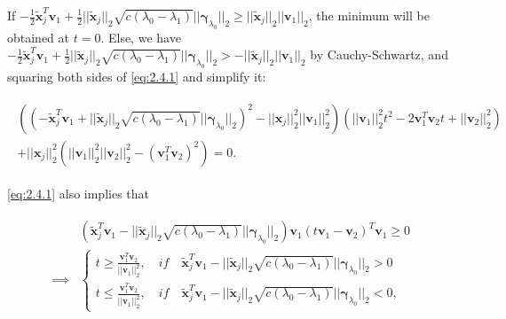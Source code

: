 If $-\frac{1}{2}\tilde{\boldsymbol x}_j^T\boldsymbol v_1+\frac{1}{2}||\tilde{\boldsymbol x}_j||_2\sqrt{c(\lambda_0-\lambda_1)}||\boldsymbol\gamma_{\lambda_0}||_2\geq ||\tilde{\boldsymbol x}_j||_2||\boldsymbol v_1||_2$, the minimum will be obtained at $t=0$. Else, we have $-\frac{1}{2}\tilde{\boldsymbol x}_j^T\boldsymbol v_1+\frac{1}{2}||\tilde{\boldsymbol x}_j||_2\sqrt{c(\lambda_0-\lambda_1)}||\boldsymbol\gamma_{\lambda_0}||_2>- ||\tilde{\boldsymbol x}_j||_2||\boldsymbol v_1||_2$ by Cauchy-Schwartz, and squaring both sides of \eqref{eq:2.4.1} and simplify it:

\begin{gather}
    \begin{aligned}
        \left(\left(-\tilde{\boldsymbol x}_j^T\boldsymbol v_1+||\tilde{\boldsymbol x}_j||_2\sqrt{c(\lambda_0-\lambda_1)}||\boldsymbol\gamma_{\lambda_0}||_2\right)^2-||\boldsymbol x_j||_2^2||\boldsymbol v_1||_2^2\right)\left(||\boldsymbol v_1||_2^2t^2-2\boldsymbol v_1^T\boldsymbol v_2 t+||\boldsymbol v_2||_2^2\right)\\
        +||\boldsymbol x_j||_2^2(||\boldsymbol v_1||_2^2||\boldsymbol v_2||_2^2-(\boldsymbol v_1^T\boldsymbol v_2)^2)=0.
    \end{aligned}
\end{gather}

\eqref{eq:2.4.1} also implies that

\begin{gather}
    \begin{aligned}
        &\left(\tilde{\boldsymbol x}_j^T\boldsymbol v_1-||\tilde{\boldsymbol x}_j||_2\sqrt{c(\lambda_0-\lambda_1)}||\boldsymbol\gamma_{\lambda_0}||_2\right)\boldsymbol v_1(t\boldsymbol v_1-\boldsymbol v_2)^T\boldsymbol v_1\geq 0\\
        \implies&\begin{cases}
        t\geq\frac{\boldsymbol v_1^T\boldsymbol v_2}{||\boldsymbol v_1||_2^2},\quad \textit{if}\quad\tilde{\boldsymbol x}_j^T\boldsymbol v_1-||\tilde{\boldsymbol x}_j||_2\sqrt{c(\lambda_0-\lambda_1)}||\boldsymbol\gamma_{\lambda_0}||_2 >0\\
        t\leq\frac{\boldsymbol v_1^T\boldsymbol v_2}{||\boldsymbol v_1||_2^2},\quad \textit{if}\quad\tilde{\boldsymbol x}_j^T\boldsymbol v_1-||\tilde{\boldsymbol x}_j||_2\sqrt{c(\lambda_0-\lambda_1)}||\boldsymbol\gamma_{\lambda_0}||_2<0,
        \end{cases}
    \end{aligned}
\end{gather}

